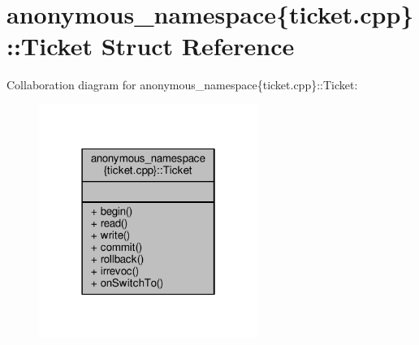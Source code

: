 \hypertarget{structanonymous__namespace_02ticket_8cpp_03_1_1Ticket}{\section{anonymous\-\_\-namespace\{ticket.\-cpp\}\-:\-:Ticket Struct Reference}
\label{structanonymous__namespace_02ticket_8cpp_03_1_1Ticket}
}


Collaboration diagram for anonymous\-\_\-namespace\{ticket.\-cpp\}\-:\-:Ticket\-:
\nopagebreak
\begin{figure}[H]
\begin{center}
\leavevmode
\includegraphics[width=202pt]{structanonymous__namespace_02ticket_8cpp_03_1_1Ticket__coll__graph}
\end{center}
\end{figure}
